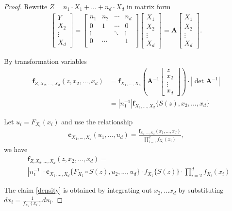 \begin{proof}
   Rewrite $Z = n_1 \cdot X_1 + ... +  n_d \cdot X_d $ in matrix form
   \begin{align}
      \begin{bmatrix}
      Y \\ X_2 \\ \vdots \\ X_d
      \end{bmatrix}
      = \begin{bmatrix}
      n_1    & n_2   & \cdots & n_d     \\
      0      & 1     &  \cdots & 0       \\
      \vdots &       & \ddots & \vdots \\
      0      & \cdots &       & 1  \\
      \end{bmatrix}
      \begin{bmatrix}
         X_1 \\ X_2 \\ \vdots \\ X_d
      \end{bmatrix}
      = \bm{A}
      \begin{bmatrix}
         X_1 \\ X_2 \\ \vdots \\ X_d
      \end{bmatrix}.
      \end{align} \medskip

   By transformation variables
   \begin{align}
      \bm{f}_{Z,X_2,...,X_d}(z, x_2, ...,x_d) &= \bm{f}_{X_1,...,X_d}\left( \bm{A}^{-1}
      \begin{bmatrix}
         z \\ x_2 \\ \vdots \\ x_d
      \end{bmatrix}
      \right)  \cdot |\det \bm{A}^{-1}| \\
      &= \left| n_1^{-1} \right| \bm{f}_{X_1,...,X_d}\{S(z), x_2,...,x_d\}
      \end{align} \medskip

   Let $u_i = F_{X_i}(x_i)$ and
   use the relationship
   \begin{align}
      \bm{c}_{X_1,...,X_d}(u_1, ..., u_d)=\frac{\bm{f}_{X_1,...,X_d}(x_1,...,x_d)}{\prod_{i=1}^d f_{X_i}(x_i)},
   \end{align}
   we have
   \begin{align}
     & \bm{f}_{Z,X_2,...,X_d}(z, x_2, ...,x_d) = \\
      & \left| n_1^{-1} \right| \cdot
      \bm{c}_{X_1,...,X_d}\{F_{X_1} \circ S(z), u_2, ...,  u_d\}  \cdot
      f_{X_1} \{ S(z) \} \cdot
      \prod_{i=2}^d f_{X_i}(x_i)
      \end{align}

   The claim \ref{density} is obtained by integrating out $x_2, ... x_d$ by substituting $dx_i = \frac{1}{f_{X_i}(x_i)}du_i$.
   \end{proof}